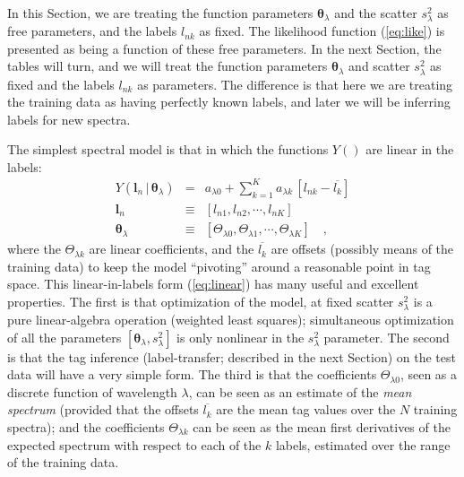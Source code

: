 \documentclass[12pt, preprint]{aastex}
\newcommand{\sectionname}{Section}
\newcommand{\set}[1]{\bm{#1}}
\newcommand{\mean}[1]{\overline{#1}}
\newcommand{\given}{\,|\,}
\begin{document}
In this \sectionname, we are treating the function parameters
$\set{\theta}_\lambda$ and the scatter $s_\lambda^2$ as free parameters, and the
labels $l_{nk}$ as fixed.
The likelihood function (\ref{eq:like}) is presented as being a
function of these free parameters.
In the next \sectionname, the tables will turn, and we will treat the
function parameters $\set{\theta}_\lambda$ and scatter $s_{\lambda}^2$ as fixed and
the labels $l_{nk}$ as parameters.
The difference is that here we are treating the training data as
having perfectly known labels, and later we will be inferring labels for
new spectra.

The simplest spectral model is that in which the functions $Y()$ are
linear in the labels:
\begin{eqnarray}
Y(\set{l}_n\given\set{\theta}_\lambda) &=&
 a_{\lambda 0} + \sum_{k=1}^K a_{\lambda k}\,[l_{nk} - \mean{l_k}]
\label{eq:linear}\\
\set{l}_n &\equiv& [l_{n1}, l_{n2}, \cdots, l_{nK}]
\\
\set{\theta}_\lambda &\equiv& [\Theta_{\lambda 0}, \Theta_{\lambda 1}, \cdots, \Theta_{\lambda K}]
\quad ,
\end{eqnarray}
where the $\Theta_{\lambda k}$ are linear coefficients, and
the $\mean{l_k}$ are offsets (possibly means of the training data) to
keep the model ``pivoting'' around a reasonable point in tag space.
This linear-in-labels form (\ref{eq:linear}) has many useful and
excellent properties.
The first is that optimization of the model, at fixed scatter
$s_\lambda^2$ is a pure linear-algebra operation (weighted least
squares); simultaneous optimization of all the parameters
$[\set{\theta}_\lambda,s_\lambda^2]$ is only nonlinear in the $s_\lambda^2$
parameter.
The second is that the tag inference (label-transfer; described in the
next Section) on the test data will have a very simple form.
The third is that the coefficients $\Theta_{\lambda 0}$, seen as a discrete
function of wavelength $\lambda$, can be seen as an estimate of
the \emph{mean spectrum} (provided that the offsets $\mean{l_k}$ are
the mean tag values over the $N$ training spectra); and the
coefficients $\Theta_{\lambda k}$ can be seen as the mean first derivatives of
the expected spectrum with respect to each of the $k$ labels, estimated
over the range of the training data.
\end{document}
